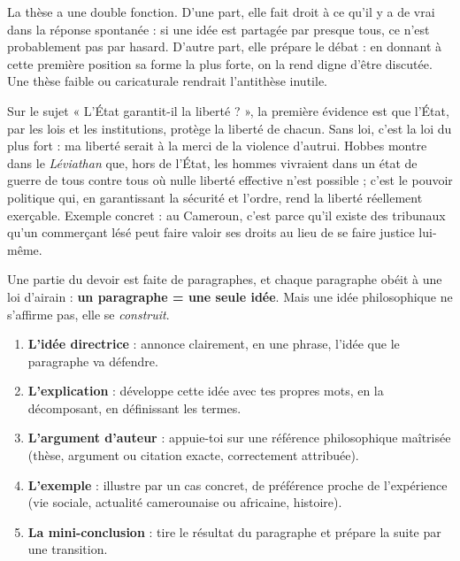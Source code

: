 \documentclass[11pt]{article}
\newcounter{popsec}
\newcounter{popsub}
\newcommand{\courssub}[1]{%
  \stepcounter{popsub}%
  \par\vspace{9pt}\noindent{\popxbold\fontsize{11.5}{13}\selectfont\color{popink}{\color{poporange}\thepopsec.\thepopsub}\hspace{6pt}#1}\par\nopagebreak\vspace{4pt}
}
\begin{document}
La thèse a une double fonction. D'une part, elle fait droit à ce qu'il y a de vrai dans la réponse spontanée : si une idée est partagée par presque tous, ce n'est probablement pas par hasard. D'autre part, elle prépare le débat : en donnant à cette première position sa forme la plus forte, on la rend digne d'être discutée. Une thèse faible ou caricaturale rendrait l'antithèse inutile.

\begin{exemplebox}
Sur le sujet « L'État garantit-il la liberté ? », la première évidence est que l'État, par les lois et les institutions, protège la liberté de chacun. Sans loi, c'est la loi du plus fort : ma liberté serait à la merci de la violence d'autrui. Hobbes montre dans le \emph{Léviathan} que, hors de l'État, les hommes vivraient dans un état de guerre de tous contre tous où nulle liberté effective n'est possible ; c'est le pouvoir politique qui, en garantissant la sécurité et l'ordre, rend la liberté réellement exerçable. Exemple concret : au Cameroun, c'est parce qu'il existe des tribunaux qu'un commerçant lésé peut faire valoir ses droits au lieu de se faire justice lui-même.
\end{exemplebox}

\courssub{Construire un paragraphe argumenté}

Une partie du devoir est faite de paragraphes, et chaque paragraphe obéit à une loi d'airain : \textbf{un paragraphe = une seule idée}. Mais une idée philosophique ne s'affirme pas, elle se \emph{construit}.

\begin{methode}
\begin{enumerate}
\item \textbf{L'idée directrice} : annonce clairement, en une phrase, l'idée que le paragraphe va défendre.
\item \textbf{L'explication} : développe cette idée avec tes propres mots, en la décomposant, en définissant les termes.
\item \textbf{L'argument d'auteur} : appuie-toi sur une référence philosophique maîtrisée (thèse, argument ou citation exacte, correctement attribuée).
\item \textbf{L'exemple} : illustre par un cas concret, de préférence proche de l'expérience (vie sociale, actualité camerounaise ou africaine, histoire).
\item \textbf{La mini-conclusion} : tire le résultat du paragraphe et prépare la suite par une transition.
\end{enumerate}
\end{methode}
\end{document}
